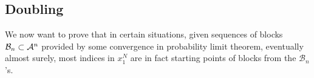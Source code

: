 \subsection{Doubling}
We now want to prove that in certain situations, given sequences of blocks $\mathcal{B}_n \subset \mathcal{A}^n$ provided by some convergence in probability limit theorem, eventually almost surely, most indices in $x_1^N$ are in fact starting points of blocks from the $\mathcal{B}_n$'s.


